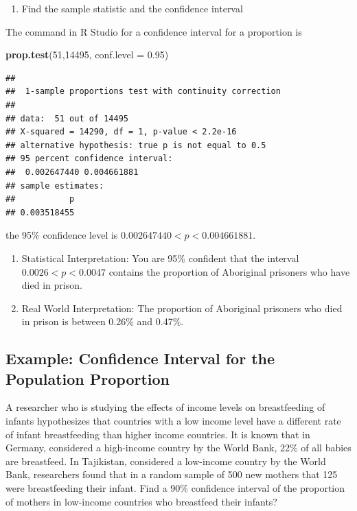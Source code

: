 \documentclass[]{book}
\newenvironment{Shaded}{\begin{snugshade}}{\end{snugshade}}
\newcommand{\DataTypeTok}[1]{\textcolor[rgb]{0.13,0.29,0.53}{#1}}
\newcommand{\DecValTok}[1]{\textcolor[rgb]{0.00,0.00,0.81}{#1}}
\newcommand{\FloatTok}[1]{\textcolor[rgb]{0.00,0.00,0.81}{#1}}
\newcommand{\KeywordTok}[1]{\textcolor[rgb]{0.13,0.29,0.53}{\textbf{#1}}}
\newcommand{\NormalTok}[1]{#1}
\providecommand{\tightlist}{%
  \setlength{\itemsep}{0pt}\setlength{\parskip}{0pt}}
\begin{document}
\begin{enumerate}
\def\labelenumi{\arabic{enumi}.}
\setcounter{enumi}{2}
\tightlist
\item
  Find the sample statistic and the confidence interval
\end{enumerate}

The command in R Studio for a confidence interval for a proportion is

\begin{Shaded}
\begin{Highlighting}[]
\KeywordTok{prop.test}\NormalTok{(}\DecValTok{51}\NormalTok{,}\DecValTok{14495}\NormalTok{, }\DataTypeTok{conf.level =} \FloatTok{0.95}\NormalTok{)}
\end{Highlighting}
\end{Shaded}

\begin{verbatim}
## 
##  1-sample proportions test with continuity correction
## 
## data:  51 out of 14495
## X-squared = 14290, df = 1, p-value < 2.2e-16
## alternative hypothesis: true p is not equal to 0.5
## 95 percent confidence interval:
##  0.002647440 0.004661881
## sample estimates:
##           p 
## 0.003518455
\end{verbatim}

the 95\% confidence level is \(0.002647440<p<0.004661881\).

\begin{enumerate}
\def\labelenumi{\arabic{enumi}.}
\setcounter{enumi}{3}
\item
  Statistical Interpretation: You are 95\% confident that the interval \(0.0026<p<0.0047\) contains the proportion of Aboriginal prisoners who have died in prison.
\item
  Real World Interpretation: The proportion of Aboriginal prisoners who died in prison is between 0.26\% and 0.47\%.
\end{enumerate}

\hypertarget{example-confidence-interval-for-the-population-proportion-1}{%
\subsection{Example: Confidence Interval for the Population Proportion}\label{example-confidence-interval-for-the-population-proportion-1}}

A researcher who is studying the effects of income levels on breastfeeding of infants hypothesizes that countries with a low income level have a different rate of infant breastfeeding than higher income countries. It is known that in Germany, considered a high-income country by the World Bank, 22\% of all babies are breastfeed. In Tajikistan, considered a low-income country by the World Bank, researchers found that in a random sample of 500 new mothers that 125 were breastfeeding their infant. Find a 90\% confidence interval of the proportion of mothers in low-income countries who breastfeed their infants?
\end{document}

